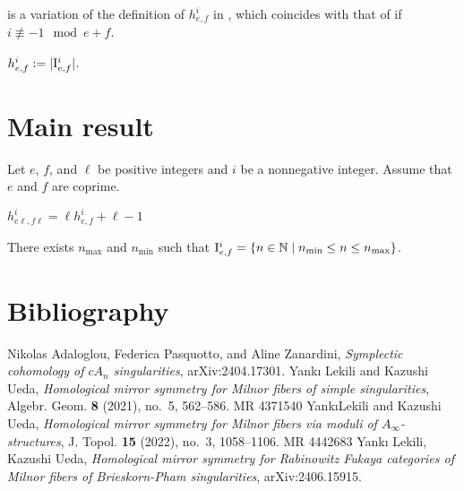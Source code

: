 
 is a variation
of the definition of $h_{e,f}^i$ in \cite{2406.15915},
which coincides with that of \cite{2406.15915}
if $i \not \equiv -1 \mod e+f$.

\begin{definition}
\label{def:h}
\leanok
{}
$
h_{e,f}^i
:=
|\mathrm{I}_{e,f}^i|
$.
\end{definition}

\chapter{Main result}

Let $e$, $f$, and $\ell$ be positive integers
and $i$ be a nonnegative integer.
Assume that $e$ and $f$ are coprime.

\begin{proposition}[{\cite[Proposition 5.1]{2406.15915}}]
\label{prop:main}
$
h_{e \ell, f \ell}^i = \ell h_{e,f}^i + \ell - 1
$
\end{proposition}

\begin{lemma} \label{lem:I_is_interval}
There exists $n_{\max}$ and $n_{\min}$ such that
$\mathrm{I}_{e,f}^i = \{n \in \mathbb{N} \mid n_{\min} \le n \le n_{\max}\}$.
\end{lemma}

\chapter{Bibliography}

\def\cprime{$'$} \def\cprime{$'$}
\providecommand{\bysame}{\leavevmode\hbox to3em{\hrulefill}\thinspace}
\providecommand{\MR}{\relax\ifhmode\unskip\space\fi MR }
\providecommand{\MRhref}[2]{%
  \href{http://www.ams.org/mathscinet-getitem?mr=#1}{#2}
}
\providecommand{\href}[2]{#2}

\begin{thebibliography}{LU22}
Nikolas Adaloglou, Federica Pasquotto, and Aline Zanardini, \emph{Symplectic cohomology of {$cA_n$} singularities}, arXiv:2404.17301.
Yank{\i} Lekili and Kazushi Ueda, \emph{Homological mirror symmetry for {M}ilnor fibers of simple singularities}, Algebr. Geom. \textbf{8} (2021), no.~5, 562--586. \MR{4371540}
Yank\i Lekili and Kazushi Ueda, \emph{Homological mirror symmetry for {M}ilnor fibers via moduli of {$A_\infty$}-structures}, J. Topol. \textbf{15} (2022), no.~3, 1058--1106. \MR{4442683}
Yank{\i} Lekili, Kazushi Ueda,
\emph{Homological mirror symmetry for Rabinowitz Fukaya categories
of Milnor fibers of Brieskorn-Pham singularities},
arXiv:2406.15915.
\end{thebibliography}